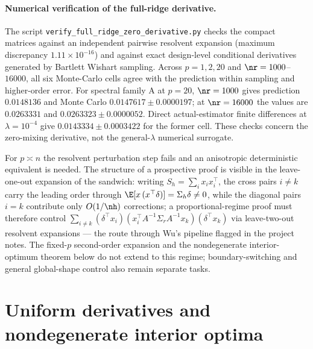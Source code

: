 \paragraph{Numerical verification of the full-ridge derivative.}
The script \texttt{verify\_full\_ridge\_zero\_derivative.py} checks the compact matrices against an independent pairwise resolvent expansion (maximum discrepancy $1.11\times10^{-16}$) and against exact design-level conditional derivatives generated by Bartlett Wishart sampling. Across $p=1,2,20$ and $\nr=1000$--$16000$, all six Monte-Carlo cells agree with the prediction within sampling and higher-order error. For spectral family A at $p=20$, $\nr=1000$ gives prediction $0.0148136$ and Monte Carlo $0.0147617\pm0.0000197$; at $\nr=16000$ the values are $0.0263331$ and $0.0263323\pm0.0000052$. Direct actual-estimator finite differences at $\lambda=10^{-4}$ give $0.0143334\pm0.0003422$ for the former cell. These checks concern the zero-mixing derivative, not the general-$\lambda$ numerical surrogate.

\begin{remark}
For $p \asymp n$ the resolvent perturbation step fails and an anisotropic deterministic equivalent is needed.
The structure of a prospective proof is visible in the leave-one-out expansion of the sandwich: writing $S_h = \sum_i x_i x_i^\top$, the cross pairs $i \neq k$ carry the leading order through $\E[x\,(x^\top\delta)] = \Sigma_h\delta \neq 0$, while the diagonal pairs $i = k$ contribute only $O(1/\nh)$ corrections; a proportional-regime proof must therefore control $\sum_{i \neq k} (\delta^\top x_i)(x_i^\top A^{-1}\Sigma_r A^{-1} x_k)(\delta^\top x_k)$ via leave-two-out resolvent expansions --- the route through Wu's pipeline flagged in the project notes.
The fixed-$p$ second-order expansion and the nondegenerate interior-optimum theorem below do not extend to this regime; boundary-switching and general global-shape control also remain separate tasks.
\end{remark}

\section{Uniform derivatives and nondegenerate interior optima}
\label{supp:optfull}

